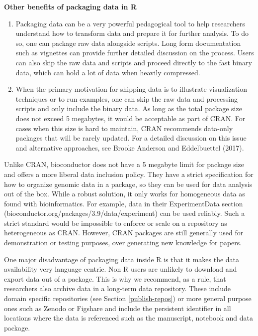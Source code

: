 \documentclass[
]{article}
\begin{document}
\textbf{Other benefits of packaging data in R}

\begin{enumerate}
\def\labelenumi{\arabic{enumi}.}
\item
  Packaging data can be a very powerful pedagogical tool to help researchers understand how to transform data and prepare it for further analysis. To do so, one can package raw data alongside scripts. Long form documentation such as vignettes can provide further detailed discussion on the process. Users can also skip the raw data and scripts and proceed directly to the fast binary data, which can hold a lot of data when heavily compressed.
\item
  When the primary motivation for shipping data is to illustrate visualization techniques or to run examples, one can skip the raw data and processing scripts and only include the binary data. As long as the total package size does not exceed 5 megabytes, it would be acceptable as part of CRAN. For cases when this size is hard to maintain, CRAN recommends data-only packages that will be rarely updated. For a detailed discussion on this issue and alternative approaches, see Brooke Anderson and Eddelbuettel (2017).
\end{enumerate}

Unlike CRAN, bioconductor does not have a 5 megabyte limit for package size and offers a more liberal data inclusion policy. They have a strict specification for how to organize genomic data in a package, so they can be used for data analysis out of the box. While a robust solution, it only works for homogeneous data as found with bioinformatics. For example, data in their ExperimentData section (bioconductor.org/packages/3.9/data/experiment) can be used reliably. Such a strict standard would be impossible to enforce or scale on a repository as heterogeneous as CRAN. However, CRAN packages are still generally used for demonstration or testing purposes, over generating new knowledge for papers.

One major disadvantage of packaging data inside R is that it makes the data availability very language centric. Non R users are unlikely to download and export data out of a package. This is why we recommend, as a rule, that researchers also archive data in a long-term data repository. These include domain specific repositories (see Section \ref{publish-repos}) or more general purpose ones such as Zenodo or Figshare and include the persistent identifier in all locations where the data is referenced such as the manuscript, notebook and data package.
\end{document}
